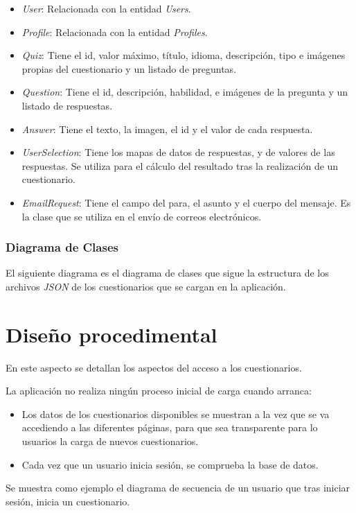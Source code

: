 \begin{itemize}
	\item \textit{User}: Relacionada con la entidad \textit{Users}.
	\item \textit{Profile}: Relacionada con la entidad \textit{Profiles}.
	\item \textit{Quiz}: Tiene el id, valor máximo, título, idioma, descripción, tipo e imágenes propias del cuestionario y un listado de preguntas.
	\item \textit{Question}: Tiene el id, descripción, habilidad, e imágenes de la pregunta y un listado de respuestas.
	\item \textit{Answer}: Tiene el texto, la imagen, el id y el valor de cada respuesta.
	\item \textit{UserSelection}: Tiene los mapas de datos de respuestas, y de valores de las respuestas. Se utiliza para el cálculo del resultado tras la realización de un cuestionario.
	\item \textit{EmailRequest}: Tiene el campo del para, el asunto y el cuerpo del mensaje. Es la clase que se utiliza en el envío de correos electrónicos.
\end{itemize}
\subsubsection{Diagrama de Clases}
El siguiente diagrama es el diagrama de clases que sigue la estructura de los archivos \textit{JSON} de los cuestionarios que se cargan en la aplicación.

\section{Diseño procedimental}
En este aspecto se detallan los aspectos del acceso a los cuestionarios.

La aplicación no realiza ningún proceso inicial de carga cuando arranca:

\begin{itemize}
	\item Los datos de los cuestionarios disponibles se muestran a la vez que se va accediendo a las diferentes páginas, para que sea transparente para lo usuarios la carga de nuevos cuestionarios.
	\item Cada vez que un usuario inicia sesión, se comprueba la base de datos.
\end{itemize}

Se muestra como ejemplo el diagrama de secuencia de un usuario que tras iniciar sesión, inicia un cuestionario.

